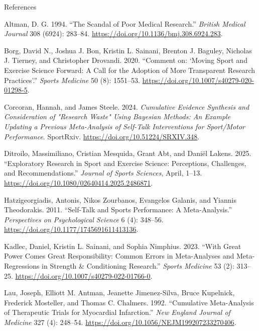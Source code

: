 \documentclass[
  ignorenonframetext,
]{beamer}
\newlength{\cslhangindent}
\newenvironment{CSLReferences}[2] %
 {\begin{list}{}{%
  \setlength{\itemindent}{0pt}
  \setlength{\leftmargin}{0pt}
  \setlength{\parsep}{0pt}
  \ifodd #1
   \setlength{\leftmargin}{\cslhangindent}
   \setlength{\itemindent}{-1\cslhangindent}
  \fi
  \setlength{\itemsep}{#2\baselineskip}}}
 {\end{list}}
\begin{document}
\begin{frame}[allowframebreaks]{References}
\protect{}\label{references}
\protect{}\label{refs}
\begin{CSLReferences}{1}{1}
Altman, D. G. 1994. {``The Scandal of Poor Medical Research.''}
\emph{British Medical Journal} 308 (6924): 283--84.
\url{https://doi.org/10.1136/bmj.308.6924.283}.

Borg, David N., Joshua J. Bon, Kristin L. Sainani, Brenton J. Baguley,
Nicholas J. Tierney, and Christopher Drovandi. 2020. {``Comment on:
{`{Moving Sport} and {Exercise Science Forward}: {A Call} for the
{Adoption} of {More Transparent Research Practices}'}.''} \emph{Sports
Medicine} 50 (8): 1551--53.
\url{https://doi.org/10.1007/s40279-020-01298-5}.

Corcoran, Hannah, and James Steele. 2024. \emph{Cumulative Evidence
Synthesis and Consideration of "Research Waste" Using {Bayesian}
Methods: {An} Example Updating a Previous Meta-Analysis of Self-Talk
Interventions for Sport/Motor Performance}. SportRxiv.
\url{https://doi.org/10.51224/SRXIV.348}.

Ditroilo, Massimiliano, Cristian Mesquida, Grant Abt, and Daniël Lakens.
2025. {``Exploratory Research in Sport and Exercise Science:
{Perceptions}, Challenges, and Recommendations.''} \emph{Journal of
Sports Sciences}, April, 1--13.
\url{https://doi.org/10.1080/02640414.2025.2486871}.

Hatzigeorgiadis, Antonis, Nikos Zourbanos, Evangelos Galanis, and
Yiannis Theodorakis. 2011. {``Self-{Talk} and {Sports Performance}: {A
Meta-Analysis}.''} \emph{Perspectives on Psychological Science} 6 (4):
348--56. \url{https://doi.org/10.1177/1745691611413136}.

Kadlec, Daniel, Kristin L. Sainani, and Sophia Nimphius. 2023. {``With
{Great Power Comes Great Responsibility}: {Common Errors} in
{Meta-Analyses} and {Meta-Regressions} in {Strength} \& {Conditioning
Research}.''} \emph{Sports Medicine} 53 (2): 313--25.
\url{https://doi.org/10.1007/s40279-022-01766-0}.

Lau, Joseph, Elliott M. Antman, Jeanette Jimenez-Silva, Bruce Kupelnick,
Frederick Mosteller, and Thomas C. Chalmers. 1992. {``Cumulative
{Meta-Analysis} of {Therapeutic Trials} for {Myocardial Infarction}.''}
\emph{New England Journal of Medicine} 327 (4): 248--54.
\url{https://doi.org/10.1056/NEJM199207233270406}.


\end{CSLReferences}
\end{frame}
\end{document}
